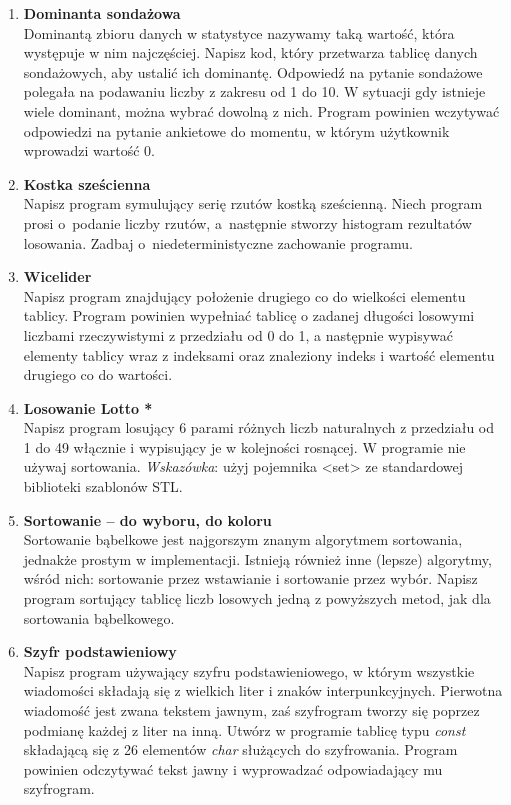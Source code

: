 \documentclass[12pt]{article}
\begin{document}
\begin{enumerate}
\item \textbf{Dominanta sondażowa}\\
Dominantą zbioru danych w statystyce nazywamy taką wartość, która występuje w nim najczęściej. Napisz kod, który przetwarza tablicę danych sondażowych, aby ustalić ich dominantę. Odpowiedź na pytanie sondażowe polegała na podawaniu liczby z zakresu od 1 do 10. W sytuacji gdy istnieje wiele dominant, można wybrać dowolną z nich. Program powinien wczytywać odpowiedzi na pytanie ankietowe do momentu, w którym użytkownik wprowadzi wartość 0.

\newpage
{}

\item \textbf{Kostka sześcienna}\\
Napisz program symulujący serię rzutów kostką sześcienną. Niech program prosi o~podanie liczby rzutów, a~następnie stworzy histogram rezultatów losowania. Zadbaj o~niedeterministyczne zachowanie programu.

\item \textbf{Wicelider}\\
Napisz program znajdujący położenie drugiego co do wielkości elementu tablicy. Program powinien wypełniać tablicę o zadanej długości losowymi liczbami rzeczywistymi z przedziału od 0 do 1, a następnie wypisywać elementy tablicy wraz z indeksami oraz znaleziony indeks i wartość elementu drugiego co do wartości.

\item \textbf{Losowanie Lotto *}\\
Napisz program losujący 6 parami różnych liczb naturalnych z przedziału od 1 do 49 włącznie i wypisujący je w kolejności rosnącej. W programie nie używaj sortowania. \textit{Wskazówka}: użyj pojemnika <set> ze standardowej biblioteki szablonów STL.

\item \textbf{Sortowanie -- do wyboru, do koloru}\\
Sortowanie bąbelkowe jest najgorszym znanym algorytmem sortowania, jednakże prostym w implementacji. Istnieją również inne (lepsze) algorytmy, wśród nich:  sortowanie przez wstawianie i sortowanie przez wybór. Napisz program sortujący tablicę liczb losowych jedną z powyższych metod, jak dla sortowania bąbelkowego.

\item \textbf{Szyfr podstawieniowy}\\
Napisz program używający szyfru podstawieniowego, w którym wszystkie wiadomości składają się z wielkich liter i znaków interpunkcyjnych. Pierwotna wiadomość jest zwana tekstem jawnym, zaś szyfrogram tworzy się poprzez podmianę każdej z liter na inną. Utwórz w programie tablicę typu \textit{const} składającą się z 26 elementów \textit{char} służących do szyfrowania. Program powinien odczytywać tekst jawny i wyprowadzać odpowiadający mu szyfrogram.


\end{enumerate}
\end{document}
